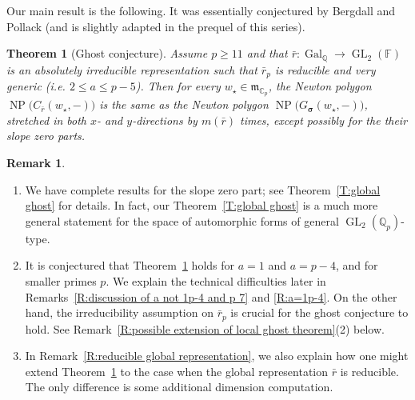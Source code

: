 \documentclass[12pt]{amsart}
\newtheorem{theorem}[subsection]{Theorem}
\theoremstyle{definition}
\newtheorem{remark}[subsection]{Remark}
\numberwithin{equation}{subsection}
\def\gothm{\mathfrak{m}}
\def\CC{\mathbb{C}}
\def\FF{\mathbb{F}}
\def\QQ{\mathbb{Q}}
\def\rmI{\mathrm{I}}
\DeclareMathOperator{\Gal}{Gal}
\DeclareMathOperator{\GL}{GL}
\DeclareMathOperator{\NP}{NP}
\newcommand{\bbsigma}{\boldsymbol{\sigma}}
\begin{document}
\medskip
Our main result is the following. It was essentially conjectured by Bergdall and Pollack \cite{bergdall-pollack2, bergdall-pollack3} (and is slightly adapted in the prequel \cite{liu-truong-xiao-zhao} of this series).
\begin{theorem}
[Ghost conjecture]\label{T:ghost intro}
Assume $p\geq 11$ and that $\bar r: \Gal_\QQ \to \GL_2(\FF)$ is an absolutely irreducible representation such that $\bar r_p$ is reducible and very generic (i.e. $2 \leq a \leq p-5$). Then for every $w_\star \in \gothm_{\CC_p}$,
the Newton polygon $\NP\big(C_{\bar r}(w_\star,-)\big)$ is the same as the Newton polygon $\NP\big(G_{\bbsigma}(w_\star,-)\big)$, stretched in both $x$- and $y$-directions by $m(\bar r)$ times, except possibly for the their slope zero parts.
\end{theorem}

\begin{remark}
\begin{enumerate}
\item 
We have complete results for the slope zero part; see Theorem~\ref{T:global ghost} for details.  In fact, our Theorem~\ref{T:global ghost} is a much more general statement for the space of automorphic forms of general $\GL_2(\QQ_p)$-type.
\item 
It is conjectured that Theorem~\ref{T:ghost intro} holds for $a=1$ and $a=p-4$, and for smaller primes $p$. We explain the technical difficulties later in Remarks~\ref{R:discussion of a not 1p-4 and p 7} and \ref{R:a=1p-4}. On the other hand, the irreducibility assumption on $\bar{r}_p$ is crucial for the ghost conjecture to hold. See Remark~\ref{R:possible extension of local ghost theorem}(2) below.
\item In Remark~\ref{R:reducible global representation}, we also explain how one might extend Theorem~\ref{T:ghost intro} to the case when the global representation $\bar r$ is reducible. The only difference is some additional dimension computation.
\end{enumerate}
\end{remark}
  
\end{document}
